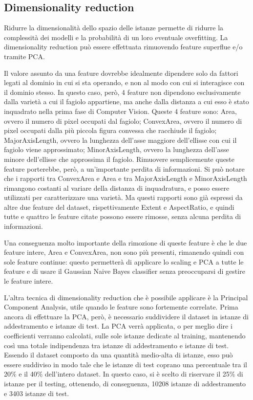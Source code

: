 \subsection{Dimensionality reduction}
Ridurre la dimensionalità dello spazio delle istanze permette di ridurre la
complessità dei modelli e la probabilità di un loro eventuale overfitting.
La dimensionality reduction può essere effettuata rimuovendo feature superflue
e/o tramite PCA.

Il valore assunto da una feature dovrebbe idealmente dipendere solo
da fattori legati al dominio in cui si sta operando, e non al modo con cui 
si interagisce con il dominio stesso. 
In questo caso, però, 4 feature non dipendono esclusivamente dalla varietà a cui
il fagiolo appartiene, ma anche dalla distanza a cui esso è stato
inquadrato nella prima fase di Computer Vision. Queste 4 feature sono: 
Area, ovvero il numero di pixel occupati dal fagiolo; ConvexArea, ovvero il
numero di pixel occupati dalla più piccola figura convessa che racchiude
il fagiolo; MajorAxisLength, ovvero la lunghezza dell'asse maggiore dell'ellisse
con cui il fagiolo viene approssimato; MinorAxisLength, ovvero la lunghezza
dell'asse minore dell'ellisse che approssima il fagiolo.
Rimuovere semplicemente queste feature porterebbe, però, a un'importante perdita
di informazioni. Si può notare che i rapporti tra ConvexArea e Area
e tra MajorAxisLength e MinorAxisLength rimangono costanti al variare della
distanza di inquadratura, e posso essere utilizzati per caratterizzare una
varietà.
Ma questi rapporti sono già espressi da altre due feature del dataset,
rispettivamente Extent e AspectRatio, e quindi tutte e quattro le feature
citate possono essere rimosse, senza alcuna perdita di informazioni.

Una conseguenza molto importante della rimozione di queste feature è che le
due feature intere, Area e ConvexArea, non sono più presenti, rimanendo quindi con sole
feature continue: questo permetterà di applicare lo scaling e PCA a tutte le
feature e di usare il Gaussian Naive Bayes classifier senza preoccuparsi di
gestire le feature intere.

L'altra tecnica di dimensionality reduction che è possibile applicare è
la Principal Component Analysis, utile quando le feature sono fortemente correlate.
Prima ancora di effettuare la PCA, però, è necessario suddividere il dataset
in istanze di addestramento e istanze di test. La PCA verrà applicata, o per meglio
dire i coefficienti verranno calcolati, sulle sole istanze dedicate 
al training, mantenendo così una totale indipendenza tra istanze di addestramento
e istanze di test.
Essendo il dataset composto da una quantità medio-alta di istanze,
esso può essere suddiviso in
modo tale che le istanze di test coprano una percentuale tra il 20\% e 
il 40\% dell'intero dataset.
In questo caso, si è scelto di riservare il 25\% di istanze per il testing,
ottenendo, di conseguenza, 10208 istanze di addestramento e 3403 istanze di test.

